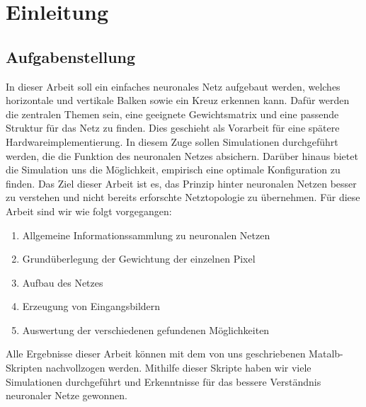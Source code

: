 \section{Einleitung}

\subsection{Aufgabenstellung}
In dieser Arbeit soll ein einfaches neuronales Netz aufgebaut werden, welches horizontale und vertikale Balken sowie ein Kreuz erkennen kann. Dafür werden die zentralen Themen sein, eine geeignete Gewichtsmatrix und eine passende Struktur für das Netz zu finden. Dies geschieht als Vorarbeit für eine spätere Hardwareimplementierung. In diesem Zuge sollen Simulationen durchgeführt werden, die die Funktion des neuronalen Netzes absichern. Darüber hinaus bietet die Simulation uns die Möglichkeit, empirisch eine optimale Konfiguration zu finden. Das Ziel dieser Arbeit ist es, das Prinzip hinter neuronalen Netzen besser zu verstehen und nicht bereits erforschte Netztopologie zu übernehmen. Für diese Arbeit sind wir wie folgt vorgegangen:
 
\begin{enumerate}
	\item Allgemeine Informationssammlung zu neuronalen Netzen
	\item Grundüberlegung der Gewichtung der einzelnen Pixel
	\item Aufbau des Netzes
	\item Erzeugung von Eingangsbildern
	\item Auswertung der verschiedenen gefundenen Möglichkeiten
\end{enumerate}

Alle Ergebnisse dieser Arbeit können mit dem von uns geschriebenen Matalb-Skripten nachvollzogen werden. Mithilfe dieser Skripte haben wir viele Simulationen durchgeführt und Erkenntnisse für das bessere Verständnis neuronaler Netze gewonnen.

